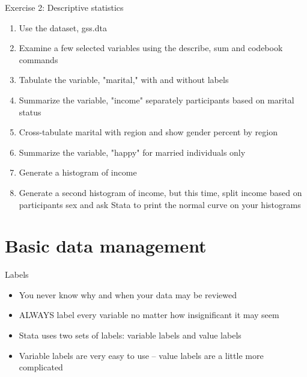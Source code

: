 \documentclass[table,smaller]{beamer}
\begin{document}
\begin{frame}[label=sec-3-3]{Exercise 2: Descriptive statistics}
\begin{enumerate}
\item Use the dataset, gss.dta
\item Examine a few selected variables using the describe, sum and codebook commands
\item Tabulate the variable, "marital," with and without labels
\item Summarize the variable, "income" separately participants based on marital status
\item Cross-tabulate marital with region and show gender percent by region
\item Summarize the variable, "happy" for married individuals only
\item Generate a histogram of income
\item Generate a second histogram of income, but this time, split income based on participants sex and ask Stata to print the normal curve on your histograms
\end{enumerate}
\end{frame}


\section{Basic data management}
\label{sec-4}

\begin{frame}[label=sec-4-1]{Labels}
\begin{itemize}
\item You never know why and when your data may be reviewed
\item ALWAYS label every variable no matter how insignificant it may seem
\item Stata uses two sets of labels: \alert{variable labels} and \alert{value labels}
\item Variable labels are very easy to use -- value labels are a little more complicated
\end{itemize}
\end{frame}
\end{document}
